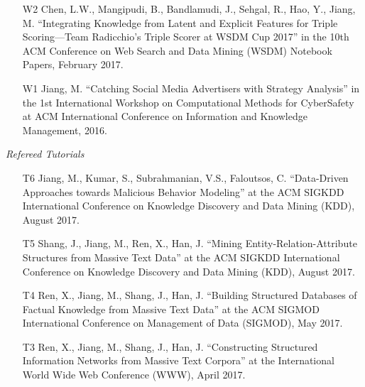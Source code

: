 \documentclass[10pt]{article}
\newenvironment{myindentpar}[1]%
{\begin{list}{}%
         {\setlength{\leftmargin}{#1}}%
         \item[]%
}
{\end{list}}
\newcounter{list}
\begin{document}
\begin{myindentpar}{0.00cm}
\begin{enumerate}[leftmargin=.5cm]
\vspace{-0.1cm}

\item[W2] Chen, L.W., Mangipudi, B., Bandlamudi, J., Sehgal, R., Hao, Y., Jiang, M. ``Integrating Knowledge from Latent and Explicit Features for Triple Scoring—Team Radicchio's Triple Scorer at WSDM Cup 2017'' in the 10th ACM Conference on Web Search and Data Mining (WSDM) Notebook Papers, February 2017.

\vspace{-0.1cm}

\item[W1] Jiang, M. ``Catching Social Media Advertisers with Strategy Analysis'' in the 1st International Workshop on Computational Methods for CyberSafety at ACM International Conference on Information and Knowledge Management, 2016.

\end{enumerate}

\hspace{-0.25cm}\emph{Refereed Tutorials}

\begin{enumerate}[leftmargin=.5cm]

\item[T6] Jiang, M., Kumar, S., Subrahmanian, V.S., Faloutsos, C. ``Data-Driven Approaches towards Malicious Behavior Modeling'' at the ACM SIGKDD International Conference on Knowledge Discovery and Data Mining (KDD), August 2017.

\item[T5] Shang, J., Jiang, M., Ren, X., Han, J. ``Mining Entity-Relation-Attribute Structures from Massive Text Data'' at the ACM SIGKDD International Conference on Knowledge Discovery and Data Mining (KDD), August 2017.

\item[T4] Ren, X., Jiang, M., Shang, J., Han, J. ``Building Structured Databases of Factual Knowledge from Massive Text Data'' at the ACM SIGMOD International Conference on Management of Data (SIGMOD), May 2017.
		
\item[T3] Ren, X., Jiang, M., Shang, J., Han, J. ``Constructing Structured Information Networks from Massive Text Corpora'' at the International World Wide Web Conference  (WWW), April 2017.


\end{enumerate}
\end{myindentpar}
\end{document}
